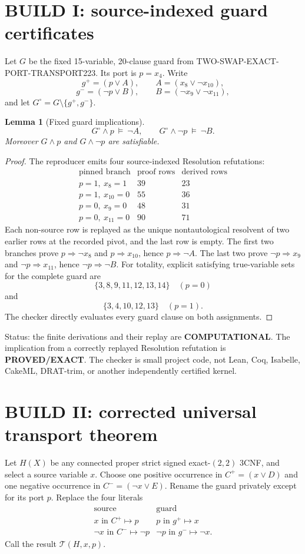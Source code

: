 \documentclass[11pt]{article}
\newtheorem{lemma}{Lemma}
\newcommand{\PROVED}{\textbf{PROVED/EXACT}}
\newcommand{\COMP}{\textbf{COMPUTATIONAL}}
\begin{document}
\section{BUILD I: source-indexed guard certificates}
Let \(G\) be the fixed 15-variable, 20-clause guard from
TWO-SWAP-EXACT-PORT-TRANSPORT223.  Its port is \(p=x_4\).  Write
\[
 g^+=(p\vee A),\qquad A=(x_8\vee\neg x_{10}),
\]
\[
 g^-=(\neg p\vee B),\qquad B=(\neg x_9\vee\neg x_{11}),
\]
and let \(G^\circ=G\setminus\{g^+,g^-\}\).

\begin{lemma}[Fixed guard implications]\label{lem:guard}
\[
 G^\circ\wedge p\ \models\ \neg A,\qquad
 G^\circ\wedge\neg p\ \models\ \neg B.
\]
Moreover \(G\wedge p\) and \(G\wedge\neg p\) are satisfiable.
\end{lemma}
\begin{proof}
The reproducer emits four source-indexed Resolution refutations:
\[
\begin{array}{c|r|r}
\text{pinned branch}&\text{proof rows}&\text{derived rows}\\ \hline
p=1,\ x_8=1&39&23\\
p=1,\ x_{10}=0&55&36\\
p=0,\ x_9=0&48&31\\
p=0,\ x_{11}=0&90&71
\end{array}
\]
Each non-source row is replayed as the unique nontautological resolvent of
two earlier rows at the recorded pivot, and the last row is empty.  The first
two branches prove \(p\Rightarrow\neg x_8\) and
\(p\Rightarrow x_{10}\), hence \(p\Rightarrow\neg A\).  The last two
prove \(\neg p\Rightarrow x_9\) and
\(\neg p\Rightarrow x_{11}\), hence
\(\neg p\Rightarrow\neg B\).
For totality, explicit satisfying true-variable sets for the complete guard
are
\[
 \{3,8,9,11,12,13,14\}\quad(p=0)
\]
and
\[
 \{3,4,10,12,13\}\quad(p=1).
\]
The checker directly evaluates every guard clause on both assignments.
\end{proof}

\noindent
Status: the finite derivations and their replay are \COMP.  The implication
from a correctly replayed Resolution refutation is \PROVED.  The checker is
small project code, not Lean, Coq, Isabelle, CakeML, DRAT-trim, or another
independently certified kernel.

\section{BUILD II: corrected universal transport theorem}
Let \(H(X)\) be any connected proper strict signed exact-$(2,2)$ 3CNF,
and select a source variable \(x\).  Choose one positive occurrence in
\(C^+=(x\vee D)\) and one negative occurrence in
\(C^-=(\neg x\vee E)\).  Rename the guard privately except for its port
\(p\).  Replace the four literals
\[
\begin{array}{c|c}
\text{source}&\text{guard}\\ \hline
x\text{ in }C^+ \mapsto p&
p\text{ in }g^+ \mapsto x\\
\neg x\text{ in }C^- \mapsto\neg p&
\neg p\text{ in }g^- \mapsto\neg x .
\end{array}
\]
Call the result \(\mathcal T(H,x,p)\).
\end{document}
